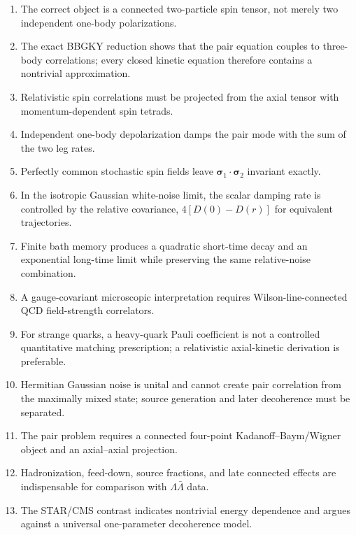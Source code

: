 \documentclass[11pt]{article}
\begin{document}
\begin{enumerate}[leftmargin=1.6em]
\item The correct object is a connected two-particle spin tensor, not merely two independent one-body polarizations.
\item The exact BBGKY reduction shows that the pair equation couples to three-body correlations; every closed kinetic equation therefore contains a nontrivial approximation.
\item Relativistic spin correlations must be projected from the axial tensor with momentum-dependent spin tetrads.
\item Independent one-body depolarization damps the pair mode with the sum of the two leg rates.
\item Perfectly common stochastic spin fields leave $\bm\sigma_1\cdot\bm\sigma_2$ invariant exactly.
\item In the isotropic Gaussian white-noise limit, the scalar damping rate is controlled by the relative covariance, $4[D(0)-D(r)]$ for equivalent trajectories.
\item Finite bath memory produces a quadratic short-time decay and an exponential long-time limit while preserving the same relative-noise combination.
\item A gauge-covariant microscopic interpretation requires Wilson-line-connected QCD field-strength correlators.
\item For strange quarks, a heavy-quark Pauli coefficient is not a controlled quantitative matching prescription; a relativistic axial-kinetic derivation is preferable.
\item Hermitian Gaussian noise is unital and cannot create pair correlation from the maximally mixed state; source generation and later decoherence must be separated.
\item The pair problem requires a connected four-point Kadanoff--Baym/Wigner object and an axial--axial projection.
\item Hadronization, feed-down, source fractions, and late connected effects are indispensable for comparison with $\Lambda\bar\Lambda$ data.
\item The STAR/CMS contrast indicates nontrivial energy dependence and argues against a universal one-parameter decoherence model.
\end{enumerate}
\end{document}
